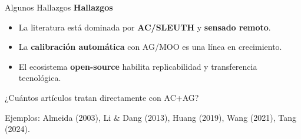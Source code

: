 \documentclass[aspectratio=169]{beamer}
\newcommand{\RefsCalib}{6}
\begin{document}
\begin{frame}{Algunos Hallazgos}
      \textbf{Hallazgos}
      \vspace{0.3em}
      {\small
      \begin{itemize}
        \item La literatura está dominada por \textbf{AC/SLEUTH} y \textbf{sensado remoto}.
        \item La \textbf{calibración automática} con AG/MOO es una línea en crecimiento.
        \item El ecosistema \textbf{open-source} habilita replicabilidad y transferencia tecnológica.
      \end{itemize}}
\end{frame}

\begin{frame}{¿Cuántos artículos tratan directamente con AC+AG?}
  \begin{center}
  \end{center}
  \vspace{-0.6em}
  \centering
  \footnotesize Ejemplos: Almeida (2003), Li \& Dang (2013), Huang (2019), Wang (2021), Tang (2024).
\end{frame}
\end{document}
